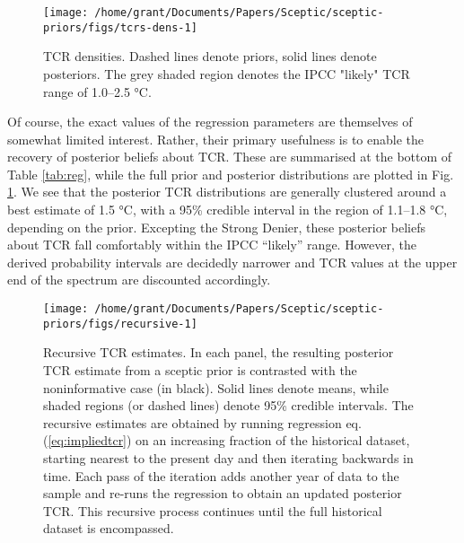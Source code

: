 \documentclass[smallextended]{svjour3}       %
\begin{document}
\begin{figure}

{\centering \texttt{[image: /home/grant/Documents/Papers/Sceptic/sceptic-priors/figs/tcrs-dens-1]} 

}

\caption{TCR densities. Dashed lines denote priors, solid lines denote posteriors. The grey shaded region denotes the IPCC "likely" TCR range of 1.0--2.5 °C.}\label{fig:tcrs-dens}
\end{figure}

Of course, the exact values of the regression parameters are themselves
of somewhat limited interest. Rather, their primary usefulness is to
enable the recovery of posterior beliefs about TCR. These are summarised
at the bottom of Table \ref{tab:reg}, while the full prior and posterior
distributions are plotted in Fig. \ref{fig:tcrs-dens}. We see that the
posterior TCR distributions are generally clustered around a best
estimate of 1.5 °C, with a 95\% credible interval in the region of
1.1--1.8 °C, depending on the prior. Excepting the Strong Denier, these
posterior beliefs about TCR fall comfortably within the IPCC ``likely''
range. However, the derived probability intervals are decidedly narrower
and TCR values at the upper end of the spectrum are discounted
accordingly.

\begin{figure}

{\centering \texttt{[image: /home/grant/Documents/Papers/Sceptic/sceptic-priors/figs/recursive-1]} 

}

\caption{Recursive TCR estimates. In each panel, the resulting posterior TCR estimate from a sceptic prior is contrasted with the noninformative case (in black). Solid lines denote means, while shaded regions (or dashed lines) denote 95\% credible intervals. The recursive estimates are obtained by running regression eq. (\ref{eq:impliedtcr}) on an increasing fraction of the historical dataset, starting nearest to the present day and then iterating backwards in time. Each pass of the iteration adds another year of data to the sample and re-runs the regression to obtain an updated posterior TCR. This recursive process continues until the full historical dataset is encompassed.}\label{fig:recursive}
\end{figure}
\end{document}
